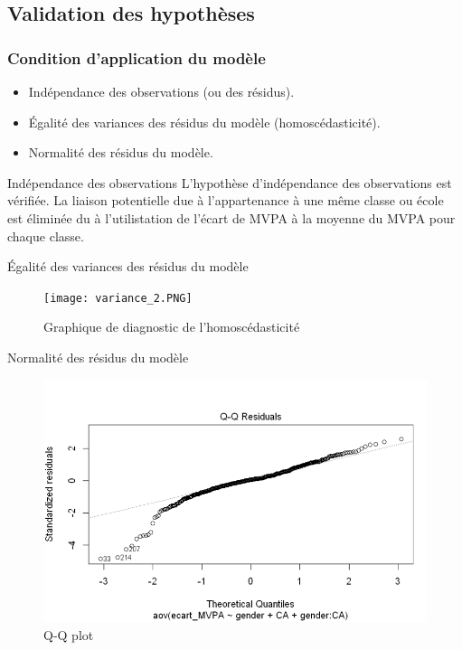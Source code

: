 \documentclass{beamer}
\begin{document}
	\subsection{Validation des hypothèses}
		\begin{frame}
			\frametitle{Condition d'application du modèle} 
			\begin{itemize}
				\item \textcolor{sectioncolor}{Indépendance des observations (ou des résidus).}
				\vfill
				\item \textcolor{sectioncolor}{Égalité des variances des résidus du modèle (homoscédasticité).}
				\vfill
				\item \textcolor{sectioncolor}{Normalité des résidus du modèle.}
			\end{itemize}
		\end{frame}
		
		\begin{frame}{Indépendance des observations}
			L'hypothèse d'indépendance des observations est vérifiée. La liaison potentielle due à l'appartenance à une même classe ou école est éliminée du à l'utilistation de l'écart de MVPA à la moyenne du MVPA pour chaque classe.
		\end{frame}
		
		\begin{frame}{Égalité des variances des résidus du modèle}
			\begin{figure}[H]
				\centering
				\texttt{[image: variance\_2.PNG]}
				\caption{Graphique de diagnostic de l'homoscédasticité}
				\label{fig:variance2}
			\end{figure}
		\end{frame}
		
		\begin{frame}{Normalité des résidus du modèle}
			\begin{figure}[H]
				\centering
				\includegraphics[width=0.8\linewidth]{Normalité_2.PNG}
				\caption{Q-Q plot}
				\label{fig:QQplot_2}
			\end{figure}
		\end{frame}
		
\end{document}
